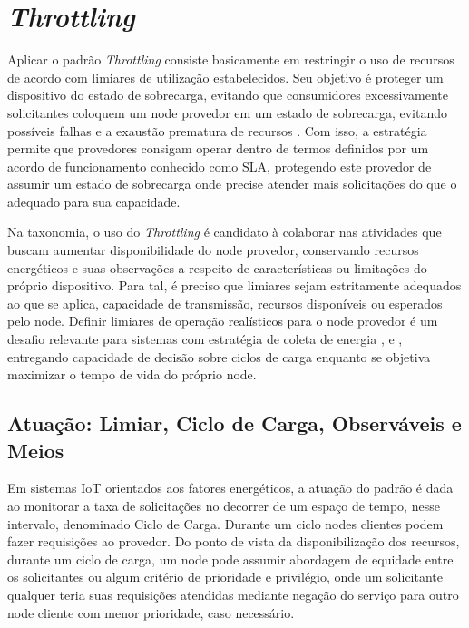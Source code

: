 \section{\textit{Throttling}}

Aplicar o padrão \textit{Throttling} consiste basicamente em restringir o uso de recursos de acordo com limiares de utilização estabelecidos. Seu objetivo é proteger um dispositivo do estado de sobrecarga, evitando que consumidores excessivamente solicitantes coloquem um node provedor em um estado de sobrecarga, evitando possíveis falhas e a exaustão prematura de recursos \cite{martinekuan_throttling_nodate}. Com isso, a estratégia permite que provedores consigam operar dentro de termos definidos por um acordo de funcionamento conhecido como \acf{SLA}, protegendo este provedor de assumir um estado de sobrecarga onde precise atender mais solicitações do que o adequado para sua capacidade.

Na taxonomia, o uso do \textit{Throttling} é candidato à colaborar nas atividades que buscam aumentar disponibilidade do node provedor, conservando  recursos energéticos e suas observações a respeito de características ou limitações do próprio dispositivo. Para tal, é preciso que limiares sejam estritamente adequados ao que se aplica, capacidade de transmissão, recursos disponíveis ou esperados pelo node. Definir limiares de operação realísticos para o node provedor é um desafio relevante para sistemas com estratégia de coleta de energia \cite{khairnar_discrete-rate_2015}, \cite{liu_energy_2016} e \cite{zhang_toward_2018}, entregando capacidade de decisão sobre ciclos de carga enquanto se objetiva maximizar o tempo de vida do próprio node.

\subsection{Atuação: Limiar, Ciclo de Carga, Observáveis e Meios}
\label{cap4:atuação}
Em sistemas \acs{IoT} orientados aos fatores energéticos, a atuação do padrão é dada ao monitorar a taxa de solicitações no decorrer de um espaço de tempo, nesse intervalo, denominado Ciclo de Carga. Durante um ciclo nodes clientes podem fazer requisições ao provedor. Do ponto de vista da disponibilização dos recursos, durante um ciclo de carga, um node pode assumir abordagem de equidade entre os solicitantes ou algum critério de prioridade e privilégio, onde um solicitante qualquer teria suas requisições atendidas mediante negação do serviço para outro node cliente com menor prioridade, caso necessário.

